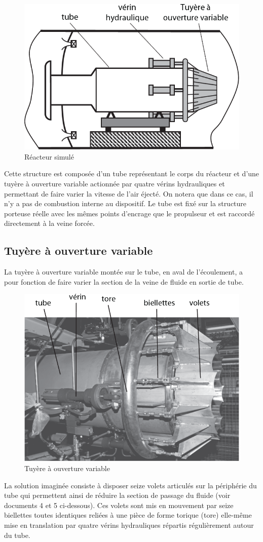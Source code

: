 \documentclass[10pt,fleqn]{article} %
\begin{document}
\begin{multicols}{2}
\begin{figure}[H]
\centering
\includegraphics[width=.5\linewidth]{doc_03}
\caption{\label{doc_03} Réacteur simulé}
\end{figure}

	Cette structure est composée d'un tube représentant le corps du réacteur et d'une tuyère à ouverture variable actionnée par quatre vérins hydrauliques et permettant de faire varier la vitesse de l'air éjecté. On notera que dans ce cas, il n'y a pas de combustion interne au dispositif. Le tube est fixé sur la structure porteuse réelle avec les mêmes points d'encrage que le propulseur et est raccordé directement à la veine forcée. 

\subsection{Tuyère à ouverture variable}

La tuyère à ouverture variable montée sur le tube, en aval de l'écoulement, a pour fonction de faire varier la section de la veine de fluide en sortie de tube.
\begin{figure}[H]
\centering
\includegraphics[width=.5\linewidth]{img_04}
\caption{\label{img_04}Tuyère à ouverture variable}
\end{figure}

	La solution imaginée consiste à disposer seize volets articulés sur la périphérie du tube qui permettent ainsi de réduire la section de passage du fluide (voir documents 4 et 5 ci-dessous). Ces volets sont mis en mouvement par seize biellettes toutes identiques reliées à une pièce de forme torique (tore) elle-même mise en translation par quatre vérins hydrauliques répartis régulièrement autour du tube.


\end{multicols}
\end{document}

